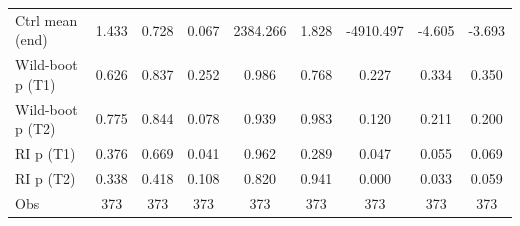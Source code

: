 {\begin{tabular}{l*{8}{c}}
Ctrl mean (end)     &       1.433         &       0.728         &       0.067         &    2384.266         &       1.828         &   -4910.497         &      -4.605         &      -3.693         \\
Wild-boot p (T1)    &       0.626         &       0.837         &       0.252         &       0.986         &       0.768         &       0.227         &       0.334         &       0.350         \\
Wild-boot p (T2)    &       0.775         &       0.844         &       0.078         &       0.939         &       0.983         &       0.120         &       0.211         &       0.200         \\
RI p (T1)           &       0.376         &       0.669         &       0.041         &       0.962         &       0.289         &       0.047         &       0.055         &       0.069         \\
RI p (T2)           &       0.338         &       0.418         &       0.108         &       0.820         &       0.941         &       0.000         &       0.033         &       0.059         \\
Obs                 &         373         &         373         &         373         &         373         &         373         &         373         &         373         &         373         \\
\bottomrule
\end{tabular}
}
